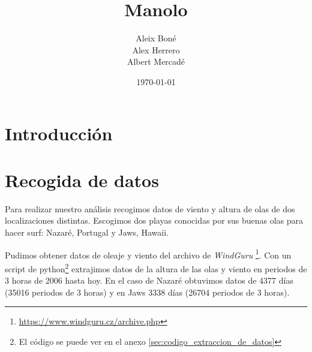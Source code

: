 

 


\lstset{style=mystyle}

\title{
   Manolo
}
\author{
  Aleix Boné\\
  Alex Herrero\\
  Albert Mercadé
}
\date{
  \today
}


\maketitle

\begin{abstract}
\end{abstract}

\section{Introducción}%
\label{sec:introduccion}

\section{Recogida de datos}%
\label{sec:recogida_de_datos}

Para realizar nuestro análisis recogimos datos de viento y altura de olas de
dos localizaciones distintas. Escogimos dos playas conocidas por sus buenas
olas para hacer surf: Nazaré, Portugal y Jaws, Hawaii.

Pudimos obtener datos de oleaje y viento del archivo de \emph{WindGuru}
\footnote{\url{https://www.windguru.cz/archive.php}}. Con un script de
python\footnote{El código se puede ver en el anexo
  \ref{sec:codigo_extraccion_de_datos}} extrajimos datos de la altura de las
olas y viento en periodos de 3 horas de 2006 hasta hoy. En el caso de Nazaré
obtuvimos datos de 4377 días (35016 periodos de 3 horas) y en Jaws 3338 días
(26704 periodos de 3 horas).

